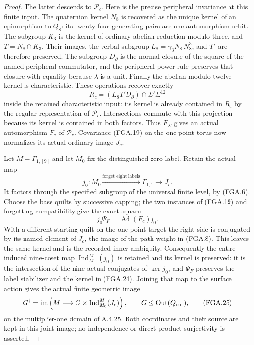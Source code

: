 \begin{proof}
The latter descends to $\mathcal P_c$.
Here is the precise peripheral invariance at this
finite input.  The quaternion kernel $N_8$ is
recovered as the unique kernel of an epimorphism
to $Q_8$: its twenty-four generating pairs are
one automorphism orbit.  The subgroup $K_3$ is
the kernel of ordinary abelian reduction modulo
three, and $T=N_8\cap K_3$.  Their images, the
verbal subgroup $L_8=\gamma_3N_8\,N_8^3$, and
$T'$ are therefore preserved.  The subgroup
$D_\partial$ is the normal closure of the square
of the named peripheral commutator, and the
peripheral power rule preserves that closure
with equality because $\lambda$ is a unit.
Finally the abelian modulo-twelve kernel is
characteristic.  These operations recover exactly
\[
 R_c=(L_8T'D_\partial)\cap\Sigma'\Sigma^{12}
                                                               \tag{FGA.22}
\]
inside the retained characteristic input: its
kernel is already contained in $R_c$ by the
regular representation of $\mathcal P_c$.
Intersections commute with this projection
because its kernel is contained in both factors.
Thus $F_\Sigma$ gives an actual automorphism
$F_c$ of $\mathcal P_c$.
Covariance (FGA.19) on the one-point torus now
normalizes its actual ordinary image $J_c$.

Let $M=\Gamma_{1,[9]}$ and let $M_0$ fix the
distinguished zero label.  Retain the actual map
\[
 j_0:M_0\xrightarrow{\text{forget eight labels}}
            \Gamma_{1,1}\longrightarrow J_c.
                                                               \tag{FGA.23}
\]
It factors through the specified subgroup of the
universal finite level, by (FGA.6).
Choose the base quilts by successive capping;
the two instances of (FGA.19) and forgetting
compatibility give the exact square
\[
                    j_0\Psi_F=\operatorname{Ad}(F_c)j_0.
                                                               \tag{FGA.24}
\]
With a different starting quilt on the one-point
target the right side is conjugated by its named
element of $J_c$, the image of the path weight
in (FGA.8).  This leaves the same kernel and is
the recorded inner ambiguity.
Consequently the entire induced nine-coset map
$\operatorname{Ind}_{M_0}^{M}(j_0)$ is retained
and its kernel is preserved: it is the intersection
of the nine actual conjugates of $\ker j_0$,
and $\Psi_F$ preserves the label stabilizer and
the kernel in (FGA.24).
Joining that map to the surface action gives the
actual finite geometric image
\[
 G^\dagger=\operatorname{im}\left(
  M\longrightarrow
  G\times\operatorname{Ind}_{M_0}^{M}(J_c)\right),
 \qquad G\leq\operatorname{Out}(Q_{\rm out}),
                                                               \tag{FGA.25}
\]
on the multiplier-one domain of A.4.25.
Both coordinates and their source are kept in
this joint image; no independence or direct-product
surjectivity is asserted.


\end{proof}
